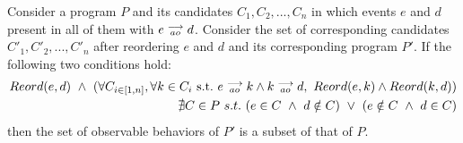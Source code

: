         \begin{corollary}
            Consider a program $P$ and its candidates $C_1, C_2, ... , C_n$ in which events $e$ and $d$ present in all of them with $e\stackrel{\longrightarrow}{_{ao}}d$. Consider the set of corresponding candidates $C'_1, C'_2, ... , C'_n$ after reordering $e$ and $d$ and its corresponding program $P'$. If the following two conditions hold:
            \begin{align}
                Reord(e,d) \ \wedge \ 
                ( \forall C_{i \in [1,n]}, \forall k \in C_i \ \text{s.t.} \ \reln{e}{ao}{k} \wedge \reln{k}{ao}{d}, \    
                Reord(e,k) \wedge Reord(k,d) ) \\
                \nexists C \in P \ s.t. \ 
                    (e \in C \ \wedge \ d \notin C) \ \vee \ 
                    (e \notin C \ \wedge \ d \in C) 
            \end{align}
            then the set of observable behaviors of $P'$ is a subset of that of $P$. 
        \end{corollary}

